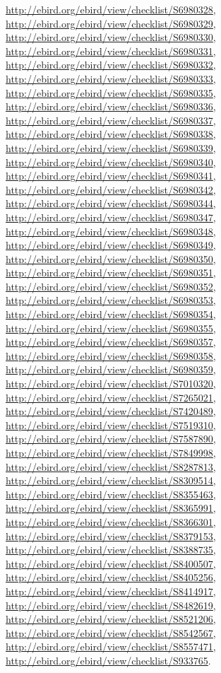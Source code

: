 \documentclass[9pt, article]{memoir}
\begin{document}
\begin{multicols}{2}
\url{http://ebird.org/ebird/view/checklist/S6980328}, 
\url{http://ebird.org/ebird/view/checklist/S6980329}, 
\url{http://ebird.org/ebird/view/checklist/S6980330}, 
\url{http://ebird.org/ebird/view/checklist/S6980331}, 
\url{http://ebird.org/ebird/view/checklist/S6980332}, 
\url{http://ebird.org/ebird/view/checklist/S6980333}, 
\url{http://ebird.org/ebird/view/checklist/S6980335}, 
\url{http://ebird.org/ebird/view/checklist/S6980336}, 
\url{http://ebird.org/ebird/view/checklist/S6980337}, 
\url{http://ebird.org/ebird/view/checklist/S6980338}, 
\url{http://ebird.org/ebird/view/checklist/S6980339}, 
\url{http://ebird.org/ebird/view/checklist/S6980340}, 
\url{http://ebird.org/ebird/view/checklist/S6980341}, 
\url{http://ebird.org/ebird/view/checklist/S6980342}, 
\url{http://ebird.org/ebird/view/checklist/S6980344}, 
\url{http://ebird.org/ebird/view/checklist/S6980347}, 
\url{http://ebird.org/ebird/view/checklist/S6980348}, 
\url{http://ebird.org/ebird/view/checklist/S6980349}, 
\url{http://ebird.org/ebird/view/checklist/S6980350}, 
\url{http://ebird.org/ebird/view/checklist/S6980351}, 
\url{http://ebird.org/ebird/view/checklist/S6980352}, 
\url{http://ebird.org/ebird/view/checklist/S6980353}, 
\url{http://ebird.org/ebird/view/checklist/S6980354}, 
\url{http://ebird.org/ebird/view/checklist/S6980355}, 
\url{http://ebird.org/ebird/view/checklist/S6980357}, 
\url{http://ebird.org/ebird/view/checklist/S6980358}, 
\url{http://ebird.org/ebird/view/checklist/S6980359}, 
\url{http://ebird.org/ebird/view/checklist/S7010320}, 
\url{http://ebird.org/ebird/view/checklist/S7265021}, 
\url{http://ebird.org/ebird/view/checklist/S7420489}, 
\url{http://ebird.org/ebird/view/checklist/S7519310}, 
\url{http://ebird.org/ebird/view/checklist/S7587890}, 
\url{http://ebird.org/ebird/view/checklist/S7849998}, 
\url{http://ebird.org/ebird/view/checklist/S8287813}, 
\url{http://ebird.org/ebird/view/checklist/S8309514}, 
\url{http://ebird.org/ebird/view/checklist/S8355463}, 
\url{http://ebird.org/ebird/view/checklist/S8365991}, 
\url{http://ebird.org/ebird/view/checklist/S8366301}, 
\url{http://ebird.org/ebird/view/checklist/S8379153}, 
\url{http://ebird.org/ebird/view/checklist/S8388735}, 
\url{http://ebird.org/ebird/view/checklist/S8400507}, 
\url{http://ebird.org/ebird/view/checklist/S8405256}, 
\url{http://ebird.org/ebird/view/checklist/S8414917}, 
\url{http://ebird.org/ebird/view/checklist/S8482619}, 
\url{http://ebird.org/ebird/view/checklist/S8521206}, 
\url{http://ebird.org/ebird/view/checklist/S8542567}, 
\url{http://ebird.org/ebird/view/checklist/S8557471}, 
\url{http://ebird.org/ebird/view/checklist/S933765}.


\end{multicols}
\end{document}
